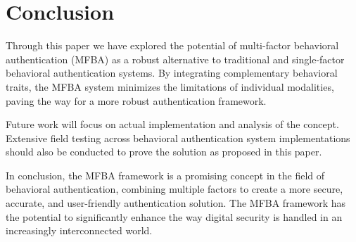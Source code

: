 \section{Conclusion}
Through this paper we have explored the potential of multi-factor behavioral authentication (MFBA) as a robust alternative to traditional and single-factor behavioral authentication systems. By integrating complementary behavioral traits, the MFBA system minimizes the limitations of individual modalities, paving the way for a more robust authentication framework.

Future work will focus on actual implementation and analysis of the concept. Extensive field testing across behavioral authentication system implementations should also be conducted to prove the solution as proposed in this paper.

In conclusion, the MFBA framework is a promising concept in the field of behavioral authentication, combining multiple factors to create a more secure, accurate, and user-friendly authentication solution. The MFBA framework has the potential to significantly enhance the way digital security is handled in an increasingly interconnected world.